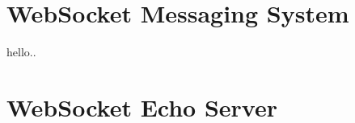 \chapter{WebSocket Messaging System}
\label{chapter:appendix-websocketMessagingSystem}

hello..

\chapter{WebSocket Echo Server}
\label{chapter:appendix-websocketEchoServer}




%
%

%
%
%
%
%
%
%
%
%
%
%
%
%
%
%
%
%
%
%
